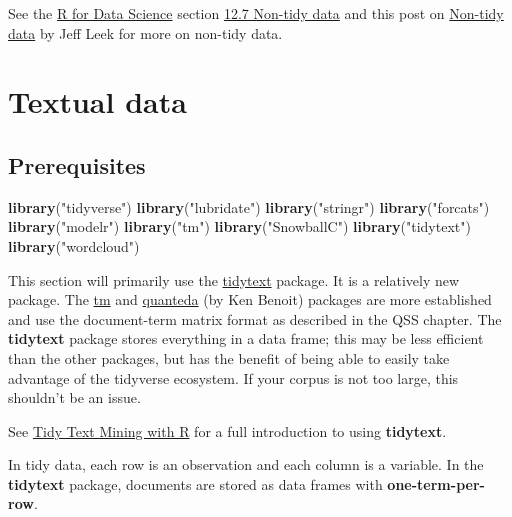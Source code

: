 \documentclass[]{book}
\newenvironment{Shaded}{\begin{snugshade}}{\end{snugshade}}
\newcommand{\KeywordTok}[1]{\textcolor[rgb]{0.13,0.29,0.53}{\textbf{#1}}}
\newcommand{\StringTok}[1]{\textcolor[rgb]{0.31,0.60,0.02}{#1}}
\newcommand{\NormalTok}[1]{#1}
\theoremstyle{definition}
\theoremstyle{definition}
\theoremstyle{definition}
\theoremstyle{remark}
\begin{document}
See the \href{http://r4ds.had.co.nz/}{R for Data Science} section
\href{http://r4ds.had.co.nz/tidy-data.html\#non-tidy-data}{12.7 Non-tidy
data} and this post on
\href{http://simplystatistics.org/2016/02/17/non-tidy-data/}{Non-tidy
data} by Jeff Leek for more on non-tidy data.

\section{Textual data}\label{textual-data}

\subsection*{Prerequisites}\label{prerequisites-4}

\begin{Shaded}
\begin{Highlighting}[]
\KeywordTok{library}\NormalTok{(}\StringTok{"tidyverse"}\NormalTok{)}
\KeywordTok{library}\NormalTok{(}\StringTok{"lubridate"}\NormalTok{)}
\KeywordTok{library}\NormalTok{(}\StringTok{"stringr"}\NormalTok{)}
\KeywordTok{library}\NormalTok{(}\StringTok{"forcats"}\NormalTok{)}
\KeywordTok{library}\NormalTok{(}\StringTok{"modelr"}\NormalTok{)}
\KeywordTok{library}\NormalTok{(}\StringTok{"tm"}\NormalTok{)}
\KeywordTok{library}\NormalTok{(}\StringTok{"SnowballC"}\NormalTok{)}
\KeywordTok{library}\NormalTok{(}\StringTok{"tidytext"}\NormalTok{)}
\KeywordTok{library}\NormalTok{(}\StringTok{"wordcloud"}\NormalTok{)}
\end{Highlighting}
\end{Shaded}

This section will primarily use the
\href{https://cran.r-project.org/package=tidytext}{tidytext} package. It
is a relatively new package. The
\href{https://cran.r-project.org/package=tm}{tm} and
\href{https://cran.r-project.org/package=quanteda}{quanteda} (by Ken
Benoit) packages are more established and use the document-term matrix
format as described in the QSS chapter. The \textbf{tidytext} package
stores everything in a data frame; this may be less efficient than the
other packages, but has the benefit of being able to easily take
advantage of the tidyverse ecosystem. If your corpus is not too large,
this shouldn't be an issue.

See \href{http://tidytextmining.com/}{Tidy Text Mining with R} for a
full introduction to using \textbf{tidytext}.

In tidy data, each row is an observation and each column is a variable.
In the \textbf{tidytext} package, documents are stored as data frames
with \textbf{one-term-per-row}.
\end{document}
